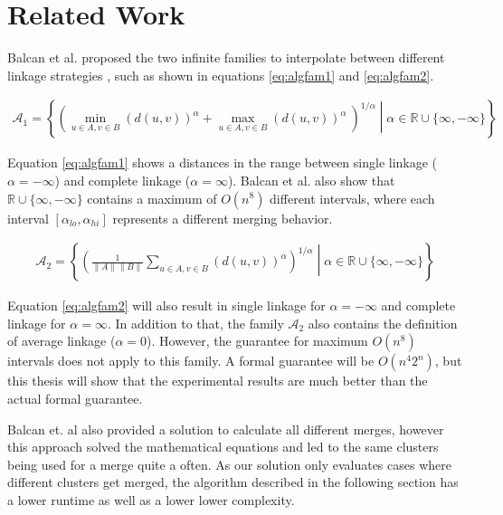 \chapter{Related Work}




Balcan et al. proposed the two infinite families to interpolate between different linkage strategies \cite{DBLP:journals/corr/BalcanNVW16}, such as shown in equations \ref{eq:algfam1} and \ref{eq:algfam2}.

\begin{equation}
    \begin{aligned}
        \mathcal{A}_1 = \left\{ \left( \min\limits_{u \in A, v \in B} (d(u,v))^\alpha +  \max\limits_{u \in A, v \in B} (d(u,v))^\alpha\ \right)^{1 / \alpha} \middle| \alpha \in \mathbb{R} \cup \{\infty, -\infty\} \right\}
    \end{aligned}
    \label{eq:algfam1}
\end{equation}

Equation \ref{eq:algfam1} shows a distances in the range between single linkage ($\alpha = -\infty$) and complete linkage ($\alpha = \infty$). Balcan et al. also show that $\mathbb{R} \cup \{\infty, -\infty\}$ contains a maximum of $O(n^8)$ different intervals, where each interval $[\alpha_{lo}, \alpha_{hi}]$ represents a different merging behavior.

\begin{equation}
    \begin{aligned}
        \mathcal{A}_2 = \left\{ \left( \frac{1}{\|A\| \|B\|} \sum\limits_{u \in A, v \in B} (d(u,v))^\alpha \right)^{1 / \alpha} \middle| \alpha \in \mathbb{R} \cup \{\infty, -\infty\} \right\}
    \end{aligned}
    \label{eq:algfam2}
\end{equation}

Equation \ref{eq:algfam2} will also result in single linkage for $\alpha = - \infty$ and complete linkage for $\alpha = \infty$. In addition to that, the family $\mathcal{A}_2$ also contains the definition of average linkage ($\alpha = 0$). However, the guarantee for maximum $O(n^8)$ intervals does not apply to this family. A formal guarantee will be $O(n^4 2^n)$, but this thesis will show that the experimental results are much better than the actual formal guarantee.

Balcan et. al also provided a solution to calculate all different merges, however this approach solved the mathematical equations and led to the same clusters being used for a merge quite a often. As our solution only evaluates cases where different clusters get merged, the algorithm described in the following section has a lower runtime as well as a lower lower complexity.
